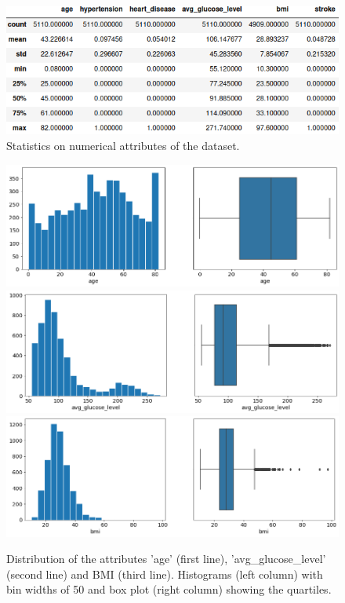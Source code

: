 \begin{figure}[H]
\centering
\includegraphics[scale=0.6]{figures/dataset_describe.png}
\caption{Statistics on numerical attributes of the dataset.}
\label{dataset_describe}
\end{figure}


\begin{figure}[H]
\centering
\includegraphics[scale=0.3]{../figures/hist_boxplot_age.png}\\
\includegraphics[scale=0.3]{../figures/hist_boxplot_avg_glucose_level.png}\\
\includegraphics[scale=0.3]{../figures/hist_boxplot_bmi.png}
\caption{Distribution of the attributes 'age' (first line), 'avg\_glucose\_level' (second line) and BMI (third line). Histograms (left column) with bin widths of 50 and box plot (right column) showing the quartiles.}
\label{hist_plots}
\end{figure}

